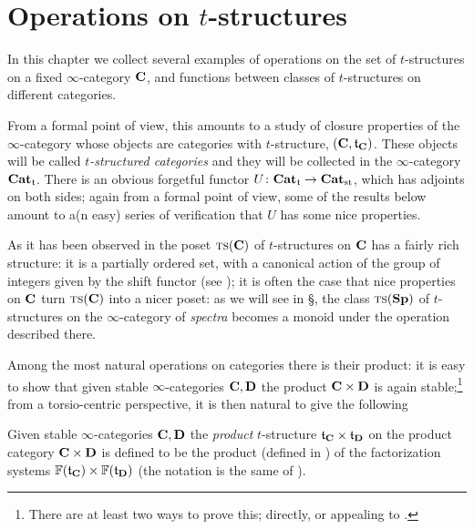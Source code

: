 \chapter{Operations on $t$\hyp{}structures}\label{chap:operat}
\thispagestyle{empty}
In this chapter we collect several examples of operations on the set of $t$\hyp{}structures on a fixed  $\infty$\hyp{}category $\textbf{C}$, and functions between classes of $t$\hyp{}structures on different categories. 

From a formal point of view, this amounts to a study of  closure properties of the $\infty$\hyp{}category whose objects are categories with $t$\hyp{}structure, $(\textbf{C},\mathfrak{t}_{\textbf{C}})$. These objects will be called \emph{$t$\hyp{}structured categories} and they will be collected in the $\infty$\hyp{}category $\textbf{Cat}_{\mathfrak{t}}$. There is an obvious forgetful functor $U\colon \textbf{Cat}_{\mathfrak{t}} \to \textbf{Cat}_\text{st}$, which has adjoints on both sides; again from a formal point of view, some of the results below amount to a(n easy) series of verification that $U$ has some nice properties.

As it has been observed in \achap {} the poset $\text{\scshape ts}(\textbf{C})$ of $t$\hyp{}structures on $\textbf{C}$ has a fairly rich structure: it is a partially ordered set, with a canonical action of the group of integers given by the shift functor (see ); it is often the case that nice properties on $\textbf{C}$ turn $\text{\scshape ts}(\textbf{C})$ into a nicer poset: as we will see in \S{}, the class $\text{\scshape ts}(\textbf{Sp})$ of $t$\hyp{}structures on the $\infty$\hyp{}category of \emph{spectra} becomes a monoid under the operation described there.

Among the most natural operations on categories there is their product: it is easy to show that given stable $\infty$\hyp{}categories $\textbf{C},\textbf{D}$ the product $\textbf{C}\times \textbf{D}$ is again stable;\footnote{There are at least two ways to prove this; directly, or appealing to \cite[\textbf{1.1.4.2}]{LurieHA}.} from a torsio\hyp{}centric perspective, it is then natural to give the following
\begin{definition}\label{product.of.fact}
Given stable $\infty$\hyp{}categories $\textbf{C},\textbf{D}$ the \emph{product} $t$\hyp{}structure $\mathfrak{t}_{\textbf{C}}\times \mathfrak{t}_{\textbf{D}}$ on the product category $\textbf{C}\times \textbf{D}$ is defined to be the product (defined in ) of the factorization systems $\mathbb{F}(\mathfrak{t}_{\textbf{C}})\times \mathbb{F}(\mathfrak{t}_{\textbf{D}})$ (the notation is the same of \athm {}).
\end{definition}
